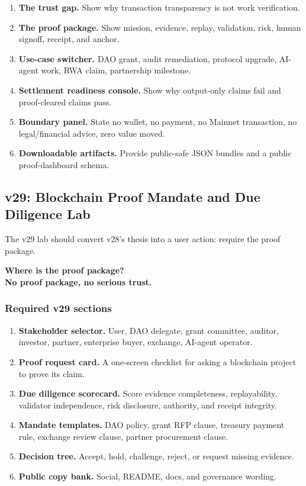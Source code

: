 \begin{enumerate}
  \item \textbf{The trust gap.} Show why transaction transparency is not work verification.
  \item \textbf{The proof package.} Show mission, evidence, replay, validation, risk, human signoff, receipt, and anchor.
  \item \textbf{Use-case switcher.} DAO grant, audit remediation, protocol upgrade, AI-agent work, RWA claim, partnership milestone.
  \item \textbf{Settlement readiness console.} Show why output-only claims fail and proof-cleared claims pass.
  \item \textbf{Boundary panel.} State no wallet, no payment, no Mainnet transaction, no legal/financial advice, zero value moved.
  \item \textbf{Downloadable artifacts.} Provide public-safe JSON bundles and a public proof-dashboard schema.
\end{enumerate}

\subsection{v29: Blockchain Proof Mandate and Due Diligence Lab}

The v29 lab should convert v28's thesis into a user action: require the proof package.

\begin{center}
{\Large\bfseries Where is the proof package?}\\[2pt]
{\large\bfseries No proof package, no serious trust.}
\end{center}

\subsubsection*{Required v29 sections}

\begin{enumerate}
  \item \textbf{Stakeholder selector.} User, DAO delegate, grant committee, auditor, investor, partner, enterprise buyer, exchange, AI-agent operator.
  \item \textbf{Proof request card.} A one-screen checklist for asking a blockchain project to prove its claim.
  \item \textbf{Due diligence scorecard.} Score evidence completeness, replayability, validator independence, risk disclosure, authority, and receipt integrity.
  \item \textbf{Mandate templates.} DAO policy, grant RFP clause, treasury payment rule, exchange review clause, partner procurement clause.
  \item \textbf{Decision tree.} Accept, hold, challenge, reject, or request missing evidence.
  \item \textbf{Public copy bank.} Social, README, docs, and governance wording.
\end{enumerate}

